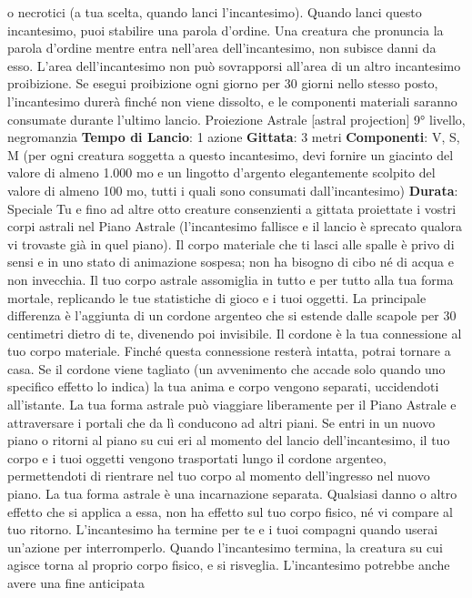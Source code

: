 \begin{multicols}{2}
o necrotici (a tua scelta, quando lanci l’incantesimo).
Quando lanci questo incantesimo, puoi stabilire una
parola d’ordine. Una creatura che pronuncia la parola
d’ordine mentre entra nell’area dell’incantesimo, non
subisce danni da esso.
L’area dell’incantesimo non può sovrapporsi all’area di
un altro incantesimo proibizione. Se esegui proibizione
ogni giorno per 30 giorni nello stesso posto,
l’incantesimo durerà finché non viene dissolto, e le
componenti materiali saranno consumate durante
l’ultimo lancio.
Proiezione Astrale
[astral projection]
9° livello, negromanzia
\textbf{Tempo di Lancio}: 1 azione
\textbf{Gittata}: 3 metri
\textbf{Componenti}: V, S, M (per ogni creatura soggetta a
questo incantesimo, devi fornire un giacinto del valore
di almeno 1.000 mo e un lingotto d’argento
elegantemente scolpito del valore di almeno 100 mo,
tutti i quali sono consumati dall’incantesimo)
\textbf{Durata}: Speciale
Tu e fino ad altre otto creature consenzienti a gittata
proiettate i vostri corpi astrali nel Piano Astrale
(l’incantesimo fallisce e il lancio è sprecato qualora vi
trovaste già in quel piano). Il corpo materiale che ti lasci
alle spalle è privo di sensi e in uno stato di animazione
sospesa; non ha bisogno di cibo né di acqua e non
invecchia.
Il tuo corpo astrale assomiglia in tutto e per tutto alla tua
forma mortale, replicando le tue statistiche di gioco e i
tuoi oggetti. La principale differenza è l’aggiunta di un
cordone argenteo che si estende dalle scapole per 30
centimetri dietro di te, divenendo poi invisibile. Il
cordone è la tua connessione al tuo corpo materiale.
Finché questa connessione resterà intatta, potrai
tornare a casa. Se il cordone viene tagliato (un
avvenimento che accade solo quando uno specifico
effetto lo indica) la tua anima e corpo vengono separati,
uccidendoti all’istante.
La tua forma astrale può viaggiare liberamente per il
Piano Astrale e attraversare i portali che da lì
conducono ad altri piani. Se entri in un nuovo piano o
ritorni al piano su cui eri al momento del lancio
dell’incantesimo, il tuo corpo e i tuoi oggetti vengono
trasportati lungo il cordone argenteo, permettendoti di
rientrare nel tuo corpo al momento dell’ingresso nel
nuovo piano. La tua forma astrale è una incarnazione
separata. Qualsiasi danno o altro effetto che si applica
a essa, non ha effetto sul tuo corpo fisico, né vi
compare al tuo ritorno.
L’incantesimo ha termine per te e i tuoi compagni
quando userai un’azione per interromperlo. Quando
l’incantesimo termina, la creatura su cui agisce torna al
proprio corpo fisico, e si risveglia.
L’incantesimo potrebbe anche avere una fine anticipata

\end{multicols}
